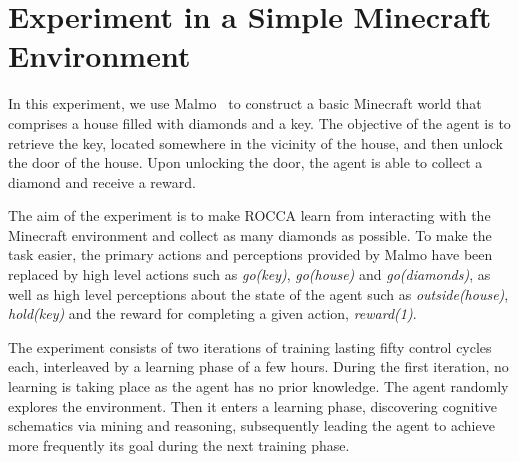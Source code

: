\documentclass[runningheads]{llncs}
\begin{document}
\section{Experiment in a Simple Minecraft Environment}
\label{sec:minecraft}
In this experiment, we use Malmo~\cite{Johnson2016} to construct a
basic Minecraft world that comprises a house filled with diamonds and
a key.  The objective of the agent is to retrieve the key, located
somewhere in the vicinity of the house, and then unlock the door of
the house. Upon unlocking the door, the agent is able to collect a
diamond and receive a reward. \par
The aim of the experiment is to make ROCCA learn from interacting
with the Minecraft environment
and collect as many diamonds as possible.
To make the task easier, the primary actions and perceptions provided
by Malmo have been replaced by high level actions
such as \textit{go(key)}, \textit{go(house)} and
\textit{go(diamonds)}, as well as high level perceptions about the
state of the agent such as \textit{outside(house)}, \textit{hold(key)}
and the reward for completing a given action, \textit{reward(1)}. \par
The experiment consists of two iterations of training lasting fifty
control cycles each, interleaved by a learning phase of a few
hours. During the first iteration, no learning is taking place as the
agent has no prior knowledge. The agent randomly explores the
environment. Then it enters a learning phase, discovering cognitive
schematics via mining and reasoning, subsequently leading the agent to
achieve more frequently its goal during the next training phase.

\end{document}
